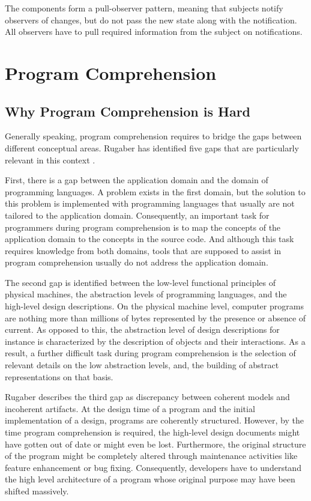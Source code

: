The components form a pull-observer pattern, meaning that subjects notify observers of changes, but do not pass the new state along with the notification.
All observers have to pull required information from the subject on notifications.

\section{Program Comprehension}

\subsection{Why Program Comprehension is Hard}
Generally speaking, program comprehension requires to bridge the gaps between different conceptual areas.
Rugaber has identified five gaps that are particularly relevant in this context \cite{kent_program_1996}.

First, there is a gap between the application domain and the domain of programming languages.
A problem exists in the first domain, but the solution to this problem is implemented with programming languages that usually are not tailored to the application domain.
Consequently, an important task for programmers during program comprehension is to map the concepts of the application domain to the concepts in the source code.
And although this task requires knowledge from both domains, tools that are supposed to assist in program comprehension usually do not address the application domain.

The second gap is identified between the low-level functional principles of physical machines, the abstraction levels of programming languages, and the high-level design descriptions.
On the physical machine level, computer programs are nothing more than millions of bytes represented by the presence or absence of current.
As opposed to this, the abstraction level of design descriptions for instance is characterized by the description of objects and their interactions.
As a result, a further difficult task during program comprehension is the selection of relevant details on the low abstraction levels, and, the building of abstract representations on that basis.

Rugaber describes the third gap as discrepancy between coherent models and incoherent artifacts.
At the design time of a program and the initial implementation of a design, programs are coherently structured.
However, by the time program comprehension is required, the high-level design documents might have gotten out of date or might even be lost.
Furthermore, the original structure of the program might be completely altered through maintenance activities like feature enhancement or bug fixing.
Consequently, developers have to understand the high level architecture of a program whose original purpose may have been shifted massively.

